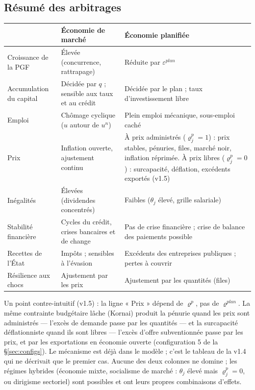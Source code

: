 \documentclass[11pt,a4paper]{article}
\begin{document}
\subsection{Résumé des arbitrages}
\begin{center}\small
\begin{tabular}{p{4.2cm}p{5.2cm}p{5.2cm}}
\toprule
& \textbf{Économie de marché} & \textbf{Économie planifiée}\\
\midrule
Croissance de la PGF & Élevée (concurrence, rattrapage) & Réduite par $\varepsilon^{plan}$\\
Accumulation du capital & Décidée par $q$ ; sensible aux taux et au crédit & Décidée par le plan ; taux d'investissement libre\\
Emploi & Chômage cyclique ($u$ autour de $u^n$) & Plein emploi mécanique, sous-emploi caché\\
Prix & Inflation ouverte, ajustement continu & À prix administrés ($\varrho^p_j=1$) : prix stables, pénuries, files, marché noir, inflation réprimée. À prix libres ($\varrho^p_j=0$) : surcapacité, déflation, excédents exportés (v1.5)\\
Inégalités & Élevées (dividendes concentrés) & Faibles ($\theta_j$ élevé, grille salariale)\\
Stabilité financière & Cycles du crédit, crises bancaires et de change & Pas de crise financière ; crise de balance des paiements possible\\
Recettes de l'État & Impôts ; sensibles à l'évasion & Excédents des entreprises publiques ; pertes à couvrir\\
Résilience aux chocs & Ajustement par les prix & Ajustement par les quantités (files)\\
\bottomrule
\end{tabular}
\end{center}
Un point contre-intuitif (v1.5) : la ligne « Prix » dépend de $\varrho^p$, pas de $\varrho^{plan}$. La même contrainte budgétaire lâche (Kornai) produit la pénurie quand les prix sont administrés — l'excès de demande passe par les quantités — et la surcapacité déflationniste quand ils sont libres — l'excès d'offre subventionnée passe par les prix, et par les exportations en économie ouverte (configuration 5 de la \S\ref{sec:configs}). Le mécanisme est déjà dans le modèle ; c'est le tableau de la v1.4 qui ne décrivait que le premier cas. Aucune des deux colonnes ne domine ; les régimes hybrides (économie mixte, socialisme de marché : $\theta_j$ élevé mais $\varrho^p_j = 0$, ou dirigisme sectoriel) sont possibles et ont leurs propres combinaisons d'effets.
\end{document}
